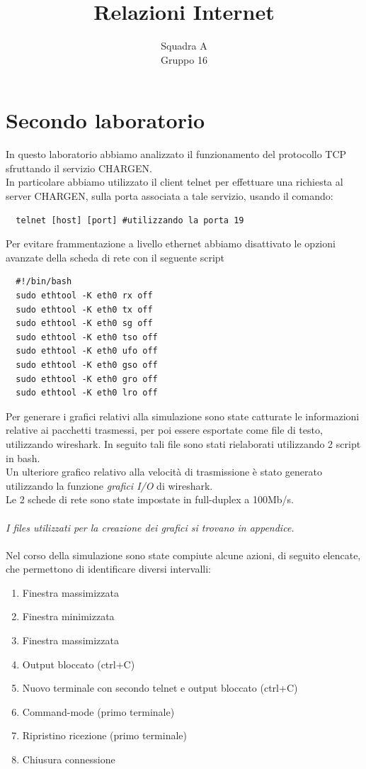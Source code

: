 \documentclass[12pt]{article}
\title{Relazioni Internet}
\author{Squadra A\\Gruppo 16}
\date{}
\begin{document}
\maketitle
\thispagestyle{fancy}


\newpage

\setcounter{page}{1}
\setlength{\headheight}{0cm}

\section{Secondo laboratorio}
In questo laboratorio abbiamo analizzato il funzionamento del protocollo TCP sfruttando il servizio CHARGEN.\\
In particolare abbiamo utilizzato il client telnet per effettuare una richiesta al server CHARGEN, sulla porta associata a tale servizio, usando il comando:
\begin{verbatim}
  telnet [host] [port] #utilizzando la porta 19
\end{verbatim}
Per evitare frammentazione a livello ethernet abbiamo disattivato le opzioni avanzate della scheda di rete con il seguente script
\begin{verbatim}
  #!/bin/bash
  sudo ethtool -K eth0 rx off
  sudo ethtool -K eth0 tx off
  sudo ethtool -K eth0 sg off
  sudo ethtool -K eth0 tso off
  sudo ethtool -K eth0 ufo off
  sudo ethtool -K eth0 gso off
  sudo ethtool -K eth0 gro off
  sudo ethtool -K eth0 lro off
\end{verbatim}
Per generare i grafici relativi alla simulazione sono state catturate le informazioni relative ai pacchetti trasmessi, per poi essere esportate come file di testo, utilizzando wireshark. In seguito tali file sono stati rielaborati utilizzando 2 script in bash.\\
Un ulteriore grafico relativo alla velocità di trasmissione è stato generato utilizzando la funzione \textit{grafici I/O} di wireshark.\\
Le 2 schede di rete sono state impostate in full-duplex a 100Mb/s.
\\\\
\textit{I files utilizzati per la creazione dei grafici si trovano in appendice.}
\\\\
Nel corso della simulazione sono state compiute alcune azioni, di seguito elencate, che permettono di identificare diversi intervalli:
\begin{enumerate}
\item Finestra massimizzata
\item Finestra minimizzata
\item Finestra massimizzata
\item Output bloccato (ctrl+C)
\item Nuovo terminale con secondo telnet e output bloccato (ctrl+C)
\item Command-mode (primo terminale)
\item Ripristino ricezione (primo terminale)
\item Chiusura connessione
\end{enumerate}
\end{document}
